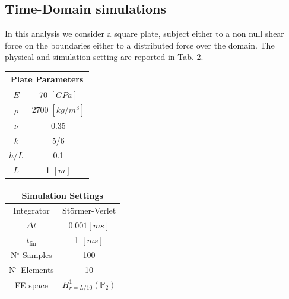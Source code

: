 \documentclass{ifacconf}
\begin{document}
 
 
\subsection{Time-Domain simulations}
In this analysis we consider a square plate, subject either to a non null shear force on the boundaries either to a distributed force over the domain. The physical and simulation setting are reported in Tab. \ref{tab:par}. 

\begin{table}[h!]
	\centering
	\begin{tabular}{|c|c|}
		\hline 
		\multicolumn{2}{|c|}{Plate Parameters} \\ 
		\hline 
		$E$ & 70 $[GPa]$ \\ 
		$\rho$ & $2700\; [kg/m^3]$ \\ 
		$\nu$& 0.35 \\ 
		$k$& 5/6 \\ 
		$h/L$& 0.1 \\ 
		$L$& 1 $[m]$ \\ 
		\hline 
	\end{tabular} 
	\begin{tabular}{|c|c|}
		\hline 
		\multicolumn{2}{|c|}{Simulation Settings} \\ 
		\hline 
		Integrator & St\"ormer-Verlet \\ 
		$\Delta t$ & $0.001 [ms]$ \\ 
		$t_{\text{fin}}$& 1 $[ms]$ \\ 
		N$^\circ$ Samples & 100 \\ 
		N$^\circ$ Elements & 10 \\
		FE space & $H_{r = L/10}^1(\mathbb{P}_2)$ \\
		\hline 
	\end{tabular} 
	\captionsetup{width=0.95\linewidth}
	\vspace{1mm}
	\label{tab:par}
\end{table}
\end{document}

